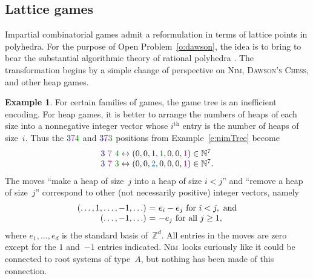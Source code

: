 \documentclass[12pt]{amsart}
\numberwithin{equation}{section}
\theoremstyle{definition}
\newtheorem{example}[thm]{Example}
\begin{document}
\subsection{Lattice games}\label{s:lattice}
Impartial combinatorial games admit a reformulation in terms of
lattice points in polyhedra.  For the purpose of Open
Problem~\ref{o:dawson}, the idea is to bring to bear the substantial
algorithmic theory of rational polyhedra \cite{bw03}.  The
transformation begins by a simple change of perspective on {\textsc{Nim}},
{\textsc{Dawson's Chess}}, and other heap games.

\begin{example}\label{e:nimLattice}
For certain families of games, the game tree is an inefficient
encoding.  For heap games, it is better to arrange the numbers
of heaps of each size into a nonnegative integer vector whose
$i^{\mathrm{th}}$ entry is the number of heaps of size~$i$.  Thus the
${\color{blue}3}{\color{darkpurple}7}{\color{darkgreen}4}$ and
${\color{blue}3}{\color{darkpurple}7}{\color{darkgreen}3}$
positions from Example~\ref{e:nimTree} become
$$\begin{array}{l}
  {\color{blue}3}\ {\color{darkpurple}7}\ {\color{darkgreen}4}
  \leftrightarrow
  (0,0,{\color{blue}1},{\color{darkgreen}1},0,0,{\color{darkpurple}1}) \in {\mathbb{N}}^7
\\
  {\color{blue}3}\ {\color{darkpurple}7}\ {\color{darkgreen}3}
  \leftrightarrow
  (0,0,{\color{turquoise}2},0,0,0,{\color{darkpurple}1}) \in {\mathbb{N}}^7.
\end{array}
$$
The moves ``make a heap of size~$j$ into a heap of size $i < j$'' and
``remove a heap of size~$j$'' correspond to other (not necessarily
positive) integer vectors, namely
$$\begin{array}{r@{\ }c@{\ }l}
  (\ldots,1,\ldots,-1,\ldots) &=& e_i - e_j \text{ for } i < j, \text{ and}
\\         (\ldots,-1,\ldots) &=& -e_j \text{ for all } j \geq 1,
\end{array}
$$
where $e_1,\ldots,e_d$ is the standard basis of~${\mathbb{Z}}^d$.  All entries
in the moves are zero except for the $1$ and~$-1$ entries indicated.
{\textsc{Nim}}\ looks curiously like it could be connected to root systems of
type~$A$, but nothing has been made of this connection.
\end{example}
\end{document}
